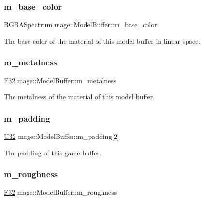 \subsubsection{\texorpdfstring{m\+\_\+base\+\_\+color}{m\_base\_color}}
{\footnotesize\ttfamily \hyperlink{structmage_1_1_r_g_b_a_spectrum}{R\+G\+B\+A\+Spectrum} mage\+::\+Model\+Buffer\+::m\+\_\+base\+\_\+color}

The base color of the material of this model buffer in linear space. \hypertarget{structmage_1_1_model_buffer_a1be491fffd79c3e5d37d066f0ef9ab96}{}\label{structmage_1_1_model_buffer_a1be491fffd79c3e5d37d066f0ef9ab96} 
\subsubsection{\texorpdfstring{m\+\_\+metalness}{m\_metalness}}
{\footnotesize\ttfamily \hyperlink{namespacemage_aa97e833b45f06d60a0a9c4fc22ae02c0}{F32} mage\+::\+Model\+Buffer\+::m\+\_\+metalness}

The metalness of the material of this model buffer. \hypertarget{structmage_1_1_model_buffer_a11ae104f8ba32afbd910a2f18d04d352}{}\label{structmage_1_1_model_buffer_a11ae104f8ba32afbd910a2f18d04d352} 
\subsubsection{\texorpdfstring{m\+\_\+padding}{m\_padding}}
{\footnotesize\ttfamily \hyperlink{namespacemage_a41c104c036fba3756a74e19f793eeaa1}{U32} mage\+::\+Model\+Buffer\+::m\+\_\+padding\mbox{[}2\mbox{]}}

The padding of this game buffer. \hypertarget{structmage_1_1_model_buffer_a33adb9ff193fcccf618bf6ceb7b1a31e}{}\label{structmage_1_1_model_buffer_a33adb9ff193fcccf618bf6ceb7b1a31e} 
\subsubsection{\texorpdfstring{m\+\_\+roughness}{m\_roughness}}
{\footnotesize\ttfamily \hyperlink{namespacemage_aa97e833b45f06d60a0a9c4fc22ae02c0}{F32} mage\+::\+Model\+Buffer\+::m\+\_\+roughness}

